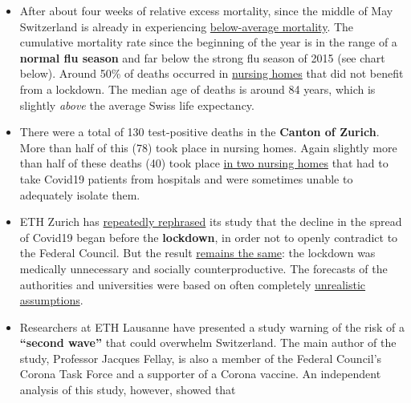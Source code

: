 \begin{itemize}
\tightlist
\item
  After about four weeks of relative excess mortality, since the middle
  of May Switzerland is already in experiencing
  \href{https://swprs.files.wordpress.com/2020/06/schweiz-todesfaelle-2010-2020_woche_22.pdf}{below-average
  mortality}. The cumulative mortality rate since the beginning of the
  year is in the range of a \textbf{normal flu season} and far below the
  strong flu season of 2015 (see chart below). Around 50\% of deaths
  occurred in
  \href{https://www.nzz.ch/zuerich/coronavirus-zuerich-aendert-nun-das-testregime-in-heimenauch-viele-aeltere-covid-19-infizierte-entwickeln-keine-symptome-zuerich-aendert-nun-das-testregime-in-heimen-ld.1552089}{nursing
  homes} that did not benefit from a lockdown. The median age of deaths
  is around 84 years, which is slightly \emph{above} the average Swiss
  life expectancy.
\item
  There were a total of 130 test-positive deaths in the \textbf{Canton
  of Zurich}. More than half of this (78) took place in nursing homes.
  Again slightly more than half of these deaths (40) took place
  \href{https://www.republik.ch/2020/05/28/toedlicher-zufall}{in two
  nursing homes} that had to take Covid19 patients from hospitals and
  were sometimes unable to adequately isolate them.
\item
  ETH Zurich has
  \href{https://www.luzernerzeitung.ch/schweiz/die-schweiz-haette-die-kurve-auch-mit-weniger-einschraenkungen-gekriegt-war-der-lockdown-uebertrieben-ld.1221111}{repeatedly
  rephrased} its study that the decline in the spread of Covid19 began
  before the \textbf{lockdown}, in order not to openly contradict to the
  Federal Council. But the result
  \href{https://infekt.ch/2020/04/sind-wir-tatsaechlich-im-blindflug/}{remains
  the same}: the lockdown was medically unnecessary and socially
  counterproductive. The forecasts of the authorities and universities
  were based on often completely
  \href{https://www.cash.ch/news/politik/coronavirus-schweizer-wissenschaftler-warnen-vor-knappheit-bei-spitalbetten-1511778}{unrealistic
  assumptions}.
\item
  Researchers at ETH Lausanne have presented a study warning of the risk
  of a \textbf{``second wave''} that could overwhelm Switzerland. The
  main author of the study, Professor Jacques Fellay, is also a member
  of the Federal Council's Corona Task Force and a supporter of a Corona
  vaccine. An independent analysis of this study, however, showed that

\end{itemize}
